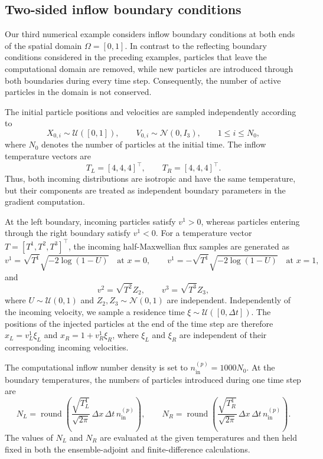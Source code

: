 \documentclass[12pt,nopreprintline]{elsarticle}
\begin{document}
{
\subsection{Two-sided inflow boundary conditions}
\label{subsec:test3}
Our third numerical example considers inflow boundary conditions at both ends of the spatial domain $\Omega=[0,1]$. In contrast to the reflecting boundary conditions considered in the preceding examples, particles that leave the computational domain are removed, while new particles are introduced through both boundaries during every time step. Consequently, the number of active particles in the domain is not conserved.

The initial particle positions and velocities are sampled independently according to
\[
X_{0,i}\sim\mathcal U([0,1]),
\qquad
V_{0,i}\sim\mathcal N(0,I_3),
\qquad
1\leq i\leq N_0,
\]
where $N_0$ denotes the number of particles at the initial time. The inflow temperature vectors are
\[
T_L=[4,4,4]^\top,
\qquad
T_R=[4,4,4]^\top.
\]
Thus, both incoming distributions are isotropic and have the same  temperature, but their components are treated as independent boundary parameters in the gradient computation.

At the left boundary, incoming particles satisfy $v^1>0$, whereas particles entering through the right boundary satisfy $v^1<0$. For a temperature vector $T=[T^1,T^2,T^3]^\top$, the incoming half-Maxwellian flux samples are generated as
\[
v^1 =
\sqrt{T^1}\sqrt{-2\log(1-U)}
\quad\text{at }x=0,
\qquad
v^1 = -\sqrt{T^1}\sqrt{-2\log(1-U)}
\quad\text{at }x=1,
\]
and
\[
v^2=\sqrt{T^2}Z_2,
\qquad
v^3=\sqrt{T^3}Z_3,
\]
where $U\sim\mathcal U(0,1)$ and $Z_2,Z_3\sim\mathcal N(0,1)$ are independent. Independently of the incoming velocity, we sample a residence time $\xi\sim\mathcal U([0,\Delta t])$. The positions of the injected particles at the end of the time step are therefore $x_L=v_L^1\xi_L$ and $x_R=1+v_R^1\xi_R$, where $\xi_L$ and $\xi_R$ are independent of their corresponding incoming velocities.

The computational inflow number density is set to $n_{\mathrm{in}}^{(p)}=1000N_0$. At the  boundary temperatures, the numbers of particles introduced during one time step are
\[
N_L =
\operatorname{round}\!\left(
\frac{\sqrt{T_L^1}}{\sqrt{2\pi}}\,
\Delta x\,\Delta t\,n_{\mathrm{in}}^{(p)}
\right),
\qquad
N_R =
\operatorname{round}\!\left(
\frac{\sqrt{T_R^1}}{\sqrt{2\pi}}\,
\Delta x\,\Delta t\,n_{\mathrm{in}}^{(p)}
\right).
\]
The values of $N_L$ and $N_R$ are evaluated at the given temperatures and then held fixed in both the ensemble-adjoint and finite-difference calculations.

}
\end{document}
